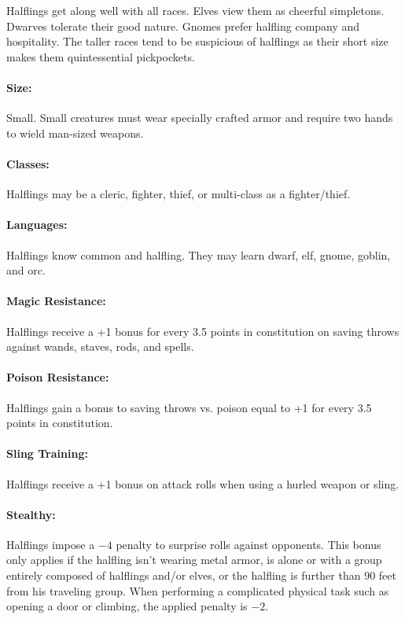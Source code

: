 \begin{multicols}{2}
Halflings get along well with all races.  Elves view them as cheerful simpletons.  Dwarves tolerate their good nature.  Gnomes prefer halfling company and hospitality.  The taller races tend to be suspicious of halflings as their short size makes them quintessential pickpockets.  

\paragraph{Size:} Small.  Small creatures must wear specially crafted armor and require two hands to wield man-sized weapons.

\paragraph{Classes:} Halflings may be a cleric, fighter, thief, or multi-class as a fighter/thief.  

\paragraph{Languages:} Halflings know common and halfling.  They may learn dwarf, elf, gnome, goblin, and orc.

\paragraph{Magic Resistance:} Halflings receive a +1 bonus for every 3.5 points in constitution on saving throws against wands, staves, rods, and spells.

\paragraph{Poison Resistance:} Halflings gain a bonus to saving throws vs. poison equal to +1 for every 3.5 points in constitution.

\paragraph{Sling Training:} Halflings receive a +1 bonus on attack rolls when using a hurled weapon or sling.

\paragraph{Stealthy:} Halflings impose a $-4$ penalty to surprise rolls against opponents.  This bonus only applies if the halfling isn't wearing metal armor, is alone or with a group entirely composed of halflings and/or elves, or the halfling is further than 90 feet from his traveling group.  When performing a complicated physical task such as opening a door or climbing, the applied penalty is $-2$.


\end{multicols}
